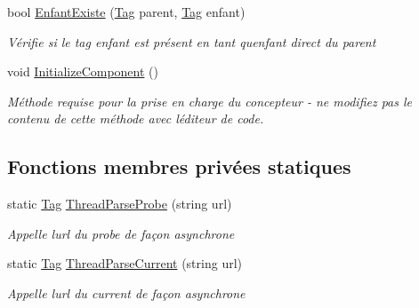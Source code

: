 \begin{DoxyCompactItemize}
bool \mbox{\hyperlink{class_m_t_connect_agent_1_1_user_control_display_tab_ae8831a67e98923b77b22df4e35842a17}{Enfant\+Existe}} (\mbox{\hyperlink{class_m_t_connect_agent_1_1_model_1_1_tag}{Tag}} parent, \mbox{\hyperlink{class_m_t_connect_agent_1_1_model_1_1_tag}{Tag}} enfant)
\begin{DoxyCompactList}\small\item\em Vérifie si le tag enfant est présent en tant qu\textquotesingle{}enfant direct du parent \end{DoxyCompactList}\item 
void \mbox{\hyperlink{class_m_t_connect_agent_1_1_user_control_display_tab_a7280eefa02218d37616dadb3c0e01136}{Initialize\+Component}} ()
\begin{DoxyCompactList}\small\item\em Méthode requise pour la prise en charge du concepteur -\/ ne modifiez pas le contenu de cette méthode avec l\textquotesingle{}éditeur de code. \end{DoxyCompactList}\end{DoxyCompactItemize}
\subsection*{Fonctions membres privées statiques}
\begin{DoxyCompactItemize}
\item 
static \mbox{\hyperlink{class_m_t_connect_agent_1_1_model_1_1_tag}{Tag}} \mbox{\hyperlink{class_m_t_connect_agent_1_1_user_control_display_tab_ad1fd6a35a00d563b8515f464a3f60afc}{Thread\+Parse\+Probe}} (string url)
\begin{DoxyCompactList}\small\item\em Appelle l\textquotesingle{}url du probe de façon asynchrone \end{DoxyCompactList}\item 
static \mbox{\hyperlink{class_m_t_connect_agent_1_1_model_1_1_tag}{Tag}} \mbox{\hyperlink{class_m_t_connect_agent_1_1_user_control_display_tab_a1035636aa3d4084fdc2b8adde3fe5e3a}{Thread\+Parse\+Current}} (string url)
\begin{DoxyCompactList}\small\item\em Appelle l\textquotesingle{}url du current de façon asynchrone \end{DoxyCompactList}\end{DoxyCompactItemize}
